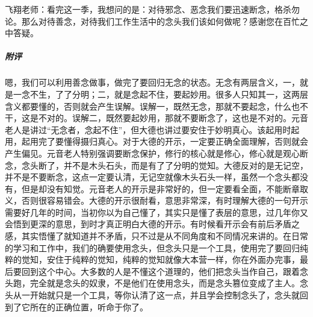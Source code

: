 \begin{case}
    飞翔老师：看完这一季，我想问的是：对待邪念、恶念我们要迅速断念，格杀勿论。那么对待善念，对待我们工作生活中的念头我们该如何做呢？感谢您在百忙之中答疑。
    \subparagraph{附评} 嗯，我们可以利用善念做事，做完了要回归无念的状态。无念有两层含义，一，就是一念不生，了了分明；二，就是念起不住，要起妙用。很多人只知其一，这两层含义都要懂的，否则就会产生误解。误解一，既然无念，那就不要起念，什么也不干，这是不对的。误解二，既然要起妙用，那就不要断念了，这也是不对的。元音老人是讲过“无念者，念起不住”，但大德也讲过要安住于妙明真心。该起用时起用，起用完了要懂得摄归真心。对于大德的开示，一定要正确全面理解，否则就会产生偏见。元音老人特别强调要断念保护，修行的核心就是修心，修心就是观心断念，念头断了，并不是木头石头，而是有了了分明的觉知。大德反对的是无记空，并不是不要断念，这点一定要认清，无记空就像木头石头一样，虽然一个念头都没有，但是却没有知觉。元音老人的开示是非常好的，但一定要看全面，不能断章取义，否则很容易错会。大德的开示很耐看，意思非常深，有时理解大德的一句开示需要好几年的时间，当初你以为自己懂了，其实只是懂了表层的意思，过几年你又会悟到更深的意思，到时才真正明白大德的开示。有时候看开示会有前后矛盾之感，其实悟懂了就知道并不矛盾，只不过是从不同角度和不同情况来讲的。在日常的学习和工作中，我们的确要使用念头，但念头只是一个工具，使用完了要回归纯粹的觉知，安住于纯粹的觉知，纯粹的觉知就像大本营一样，你在外面办完事，最后要回到这个中心。大多数的人是不懂这个道理的，他们把念头当作自己，跟着念头跑，完全就是念头的奴隶，不是他们在使用念头，而是念头篡位变成了主人。念头从一开始就只是一个工具，等你认清了这一点，并且学会控制念头了，念头就回到了它所在的正确位置，听命于你了。
\end{case}

